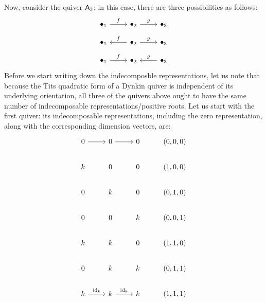 \begin{example}
                Now, consider the quiver $\sfA_3$: in this case, there are three possibilities as follows:
                    $$
                        \begin{tikzcd}
                        	{\bullet_1} & {\bullet_2} & {\bullet_3}
                        	\arrow["f", from=1-1, to=1-2]
                        	\arrow["g", from=1-2, to=1-3]
                        \end{tikzcd}
                    $$
                    $$
                        \begin{tikzcd}
                        	{\bullet_1} & {\bullet_2} & {\bullet_3}
                        	\arrow["f"', from=1-2, to=1-1]
                        	\arrow["g", from=1-2, to=1-3]
                        \end{tikzcd}
                    $$
                    $$
                        \begin{tikzcd}
                        	{\bullet_1} & {\bullet_2} & {\bullet_3}
                        	\arrow["f", from=1-1, to=1-2]
                        	\arrow["g"', from=1-3, to=1-2]
                        \end{tikzcd}
                    $$
                Before we start writing down the indecomposble representations, let us note that because the Tits quadratic form of a Dynkin quiver is independent of its underlying orientation, all three of the quivers above ought to have the same number of indecomposable representations/positive roots. Let us start with the first quiver: its indecomposable representations, including the zero representation, along with the corresponding dimension vectors, are:
                    $$
                        \begin{tikzcd}
                        	0 & 0 & 0 & {(0, 0 ,0)} \\
                        	k & 0 & 0 & {(1, 0, 0)} \\
                        	0 & k & 0 & {(0, 1, 0)} \\
                        	0 & 0 & k & {(0, 0, 1)} \\
                        	k & k & 0 & {(1, 1, 0)} \\
                        	0 & k & k & {(0, 1, 1)} \\
                        	k & k & k & {(1, 1, 1)}
                        	\arrow[from=1-1, to=1-2]
                        	\arrow[from=1-2, to=1-3]
                        	\arrow["{\id_k}", from=7-1, to=7-2]
                        	\arrow["{\id_k}", from=7-2, to=7-3]

\end{tikzcd}$$
\end{example}
